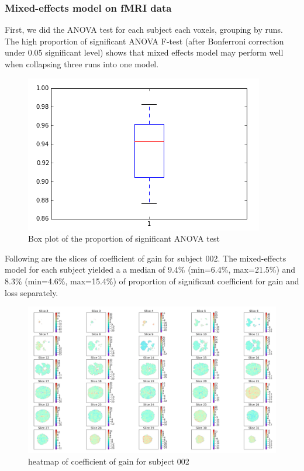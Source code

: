 \subsubsection{Mixed-effects model on fMRI data}
First, we did the ANOVA test for each subject each voxels, grouping by runs. The high proportion of significant ANOVA F-test (after  Bonferroni correction under 0.05 significant level) shows that mixed effects model may perform well when collapsing three runs into one model. 
\begin{figure}[H]
\caption{Box plot of the proportion of significant ANOVA test}
    \centering
        \includegraphics[scale=0.45]{figures/anova_prop.png}
\end{figure}
Following are the slices of coefficient of gain for subject 002. The mixed-effects model for each subject yielded a a median of 9.4\% (min=6.4\%, max=21.5\%) and 8.3\% (min=4.6\%, max=15.4\%) of proportion of significant coefficient for gain and loss separately. 
\begin{figure}[H]
\caption{heatmap of coefficient of gain for subject 002}
    \centering
        \includegraphics[scale=0.35]{figures/sub002_lme_beta_gain.png}
\end{figure}


